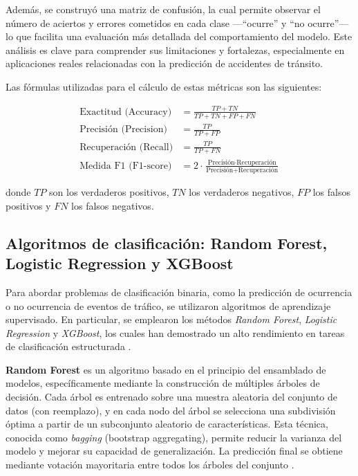\documentclass[12pt]{article}
\begin{document}
Además, se construyó una matriz de confusión, la cual permite observar el número de aciertos y errores cometidos en cada clase —“ocurre” y “no ocurre”— lo que facilita una evaluación más detallada del comportamiento del modelo. Este análisis es clave para comprender sus limitaciones y fortalezas, especialmente en aplicaciones reales relacionadas con la predicción de accidentes de tránsito.

Las fórmulas utilizadas para el cálculo de estas métricas son las siguientes:

\[
\begin{aligned}
\text{Exactitud (Accuracy)} &= \frac{TP + TN}{TP + TN + FP + FN} \\
\text{Precisión (Precision)} &= \frac{TP}{TP + FP} \\
\text{Recuperación (Recall)} &= \frac{TP}{TP + FN} \\
\text{Medida F1 (F1-score)} &= 2 \cdot \frac{\text{Precisión} \cdot \text{Recuperación}}{\text{Precisión} + \text{Recuperación}}
\end{aligned}
\]

donde \( TP \) son los verdaderos positivos, \( TN \) los verdaderos negativos, \( FP \) los falsos positivos y \( FN \) los falsos negativos.

\subsection{Algoritmos de clasificación: Random Forest, Logistic Regression y XGBoost}

Para abordar problemas de clasificación binaria, como la predicción de ocurrencia o no ocurrencia de eventos de tráfico, se utilizaron algoritmos de aprendizaje supervisado. En particular, se emplearon los métodos \textit{Random Forest}, \textit{Logistic Regression} y \textit{XGBoost}, los cuales han demostrado un alto rendimiento en tareas de clasificación estructurada \parencite{friedman2001elements, chen2016xgboost, hosmer2013applied}.

\textbf{Random Forest} es un algoritmo basado en el principio del ensamblado de modelos, específicamente mediante la construcción de múltiples árboles de decisión. Cada árbol es entrenado sobre una muestra aleatoria del conjunto de datos (con reemplazo), y en cada nodo del árbol se selecciona una subdivisión óptima a partir de un subconjunto aleatorio de características. Esta técnica, conocida como \textit{bagging} (bootstrap aggregating), permite reducir la varianza del modelo y mejorar su capacidad de generalización. La predicción final se obtiene mediante votación mayoritaria entre todos los árboles del conjunto \parencite{breiman2001random}.
\end{document}
